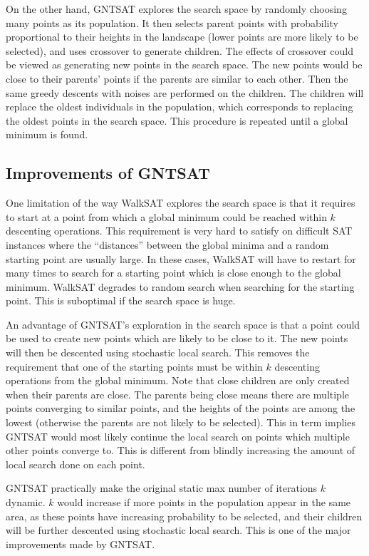On the other hand, GNTSAT explores the search space by randomly choosing many
points as its population. It then selects parent points with probability
proportional to their heights in the landscape (lower points are more likely
to be selected), and uses crossover to generate children. The effects of
crossover could be viewed as generating new points in the search space. The
new points would be close to their parents' points if the parents are similar
to each other. Then the same greedy descents with noises are performed on the
children. The children will replace the oldest individuals in the population,
which corresponds to replacing the oldest points in the search space. This
procedure is repeated until a global minimum is found.

\subsection{Improvements of GNTSAT}
One limitation of the way WalkSAT explores the search space is that it
requires to start at a point from which a global minimum could be reached
within $k$ descenting operations. This requirement is very
hard to satisfy on difficult SAT instances where the ``distances'' between the
global minima and a random starting point are usually large. In these cases,
WalkSAT will have to restart for many times to search for a starting point
which is close enough to the global minimum. WalkSAT degrades to random search
when searching for the starting point. This is suboptimal if the search space
is huge.

An advantage of GNTSAT's exploration in the search space is that a point could
be used to create new points which are likely to be close to it. The new
points will then be descented using stochastic local search. This removes the
requirement that one of the starting points must be within
$k$ descenting operations from the global minimum. Note
that close children are only created when their parents are close. The parents
being close means there are multiple points converging to similar points, and
the heights of the points are among the lowest (otherwise the parents are not
likely to be selected). This in term implies GNTSAT would most likely continue
the local search on points which multiple other points converge to. This is
different from blindly increasing the amount of local search done on each
point.

GNTSAT practically make the original static max number of iterations
$k$ dynamic. $k$ would increase if more
points in the population appear in the same area, as these points have
increasing probability to be selected, and their children will be further
descented using stochastic local search. This is one of the major improvements
made by GNTSAT.

